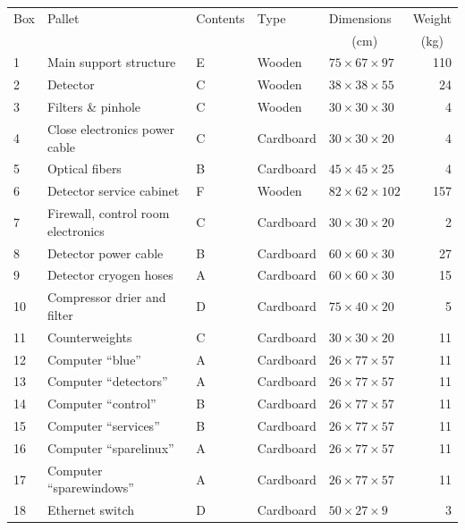 \documentclass{article}
\begin{document}
\begin{table}[p]
\begin{center}
\small
\begin{tabular}{lllllr}
\hline
Box&Pallet&Contents&Type&Dimensions&Weight\\
&&&&\multicolumn{1}{c}{(cm)}&\multicolumn{1}{c}{(kg)}\\
\hline
1	&Main support structure	            &E&Wooden     &$75 \times 67 \times 97$   &110\\
2	&Detector                           &C&Wooden     &$38 \times 38 \times 55$   &24\\
3	&Filters \& pinhole                 &C&Wooden     &$30 \times 30 \times 30$   &4\\
4	&Close electronics power cable      &C&Cardboard  &$30 \times 30 \times 20$   &4\\
5	&Optical fibers                     &B&Cardboard  &$45 \times 45 \times 25$   &4\\
6	&Detector service cabinet           &F&Wooden     &$82 \times 62 \times 102$  &157\\
7	&Firewall, control room electronics &C&Cardboard  &$30 \times 30 \times 20$   &2\\
8	&Detector power cable               &B&Cardboard  &$60 \times 60 \times 30$   &27\\
9	&Detector cryogen hoses             &A&Cardboard  &$60 \times 60 \times 30$   &15\\
10	&Compressor drier and filter        &D&Cardboard	&$75 \times 40 \times 20$   &5\\
11	&Counterweights                     &C&Cardboard  &$30 \times 30 \times 20$   &11\\ %
12	&Computer “blue”                    &A&Cardboard	&$26 \times 77 \times 57$   &11\\
13	&Computer “detectors”               &A&Cardboard	&$26 \times 77 \times 57$   &11\\
14	&Computer “control”                 &B&Cardboard	&$26 \times 77 \times 57$   &11\\
15	&Computer “services”                &B&Cardboard	&$26 \times 77 \times 57$   &11\\
16	&Computer “sparelinux”              &A&Cardboard	&$26 \times 77 \times 57$   &11\\
17	&Computer “sparewindows”            &A&Cardboard	&$26 \times 77 \times 57$   &11\\
18	&Ethernet switch                    &D&Cardboard	&$50 \times 27 \times 9$    &3\\

\end{tabular}
\end{center}
\end{table}
\end{document}

